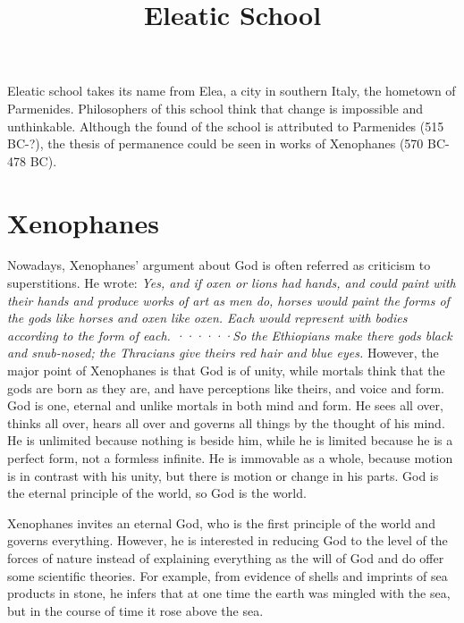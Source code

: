 \documentclass[11pt]{article}
\title{Eleatic School}
\date{}
\begin{document}
\begin{sloppypar}
  \maketitle

  \linenumbers
Eleatic school takes its name from Elea, a city in southern Italy, the hometown of Parmenides. 
Philosophers of this school think that change is impossible and unthinkable. 
Although the found of the school is attributed to Parmenides (515 BC-?), the thesis of permanence could be seen in works of Xenophanes (570 BC-478 BC).

\section{Xenophanes}
Nowadays, Xenophanes’ argument about God is often referred as criticism to superstitions. 
He wrote: 
\newline
\textit{Yes, and if oxen or lions had hands, and could paint with their hands and produce works of art as men do, horses would paint the forms of the gods like horses and oxen like oxen. Each would represent with bodies according to the form of each. ······So the Ethiopians make there gods black and snub-nosed; the Thracians give theirs red hair and blue eyes.}
\newline
However, the major point of Xenophanes is that God is of unity, while mortals think that the gods are born as they are, and have perceptions like theirs, and voice and form. 
God is one, eternal and unlike mortals in both mind and form. 
He sees all over, thinks all over, hears all over and governs all things by the thought of his mind. 
He is unlimited because nothing is beside him, while he is limited because he is a perfect form, not a formless infinite. 
He is immovable as a whole, because motion is in contrast with his unity, but there is motion or change in his parts. 
God is the eternal principle of the world, so God is the world. 

\par

Xenophanes invites an eternal God, who is the first principle of the world and governs everything. 
However, he is interested in reducing God to the level of the forces of nature instead of explaining everything as the will of God and do offer some scientific theories. 
For example, from evidence of shells and imprints of sea products in stone, he infers that at one time the earth was mingled with the sea, but in the course of time it rose above the sea.
  

\end{sloppypar}
\end{document}
